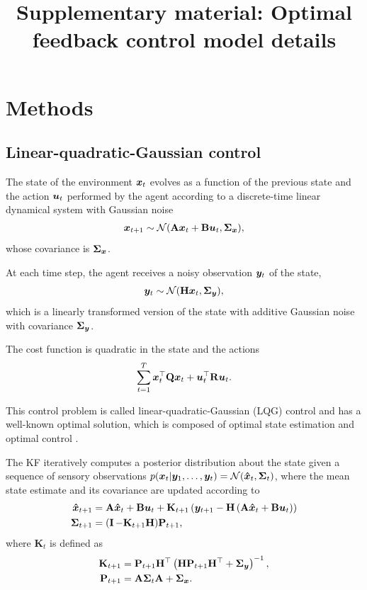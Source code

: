 \documentclass{article}
\title{Supplementary material: Optimal feedback control model details}
\begin{document}
\maketitle

\section{Methods}
\subsection{Linear-quadratic-Gaussian control}
    The state of the environment ${\bm x}_t$ evolves as a function of the previous state and the action ${\bm u}_t$ performed by the agent according to a discrete-time linear dynamical system with Gaussian noise
\begin{align}\label{eq:dynamics}
    {\bm x}_{t+1} \sim \operatorname{\mathcal{N}}(\mathbf A {\bm x}_t + \mathbf B {\bm u}_t, \mathbf \Sigma_{\bm x}),
\end{align}
whose covariance is $\mathbf \Sigma_{\bm x}$.

At each time step, the agent receives a noisy observation ${\bm y}_t$ of the state,  
\begin{align}\label{eq:obsmodel}
    {\bm y}_t \sim \operatorname{\mathcal{N}}(\mathbf H {\bm x}_t, \mathbf \Sigma_{\bm y}),
\end{align}
which is a linearly transformed version of the state with additive Gaussian noise with covariance $\mathbf \Sigma_{\bm y}$.

The cost function is quadratic in the state and the actions
\begin{align}\label{eq:quadratic-cost}
    \sum_{t=1}^T {\bm x}_t^\top \mathbf Q {\bm x}_t + {\bm u}_t^\top \mathbf R {\bm u}_t.
\end{align}

This control problem is called linear-quadratic-Gaussian (LQG) control and has a well-known optimal solution, which is composed of optimal state estimation \citep[Kalman filter, KF][]{kalman1960new} and optimal control \citep[linear-quadratic regulator, LQR][]{kalman1960contributions}.

The KF iteratively computes a posterior distribution about the state given a sequence of sensory observations $p({\bm x}_t \vert {\bm y}_{1}, \dots, {\bm y}_t) = \mathcal{N}({\bm{\hat x}}_t, \mathbf \Sigma_t)$, where the mean state estimate and its covariance are updated according to
\begin{align}
    {\bm{\hat x}}_{t+1} &= \mathbf A {\bm{\hat x}}_t + \mathbf B {\bm u}_t + \mathbf K_{t+1} \left({\bm y}_{t+1} - \mathbf H \left(\mathbf A {\bm{\hat x}}_t + \mathbf B {\bm u}_t\right)\right) \\
    \mathbf \Sigma_{t+1} &= (\operatorname{{\mathbf{I}}} - \mathbf K_{t+1} \mathbf H) \mathbf P_{t+1},
\end{align}
where $\mathbf K_t$ is defined as
\begin{align}
    \mathbf K_{t+1} &= \mathbf P_{t+1} \mathbf H^\top \left(\mathbf H \mathbf P_{t+1} \mathbf H^\top + \mathbf \Sigma_{\bm y} \right)^{-1}, \\
    \mathbf P_{t+1} &= \mathbf A \mathbf \Sigma_{t} \mathbf A + \mathbf \Sigma_{\bm x}. \\
\end{align}
\end{document}
